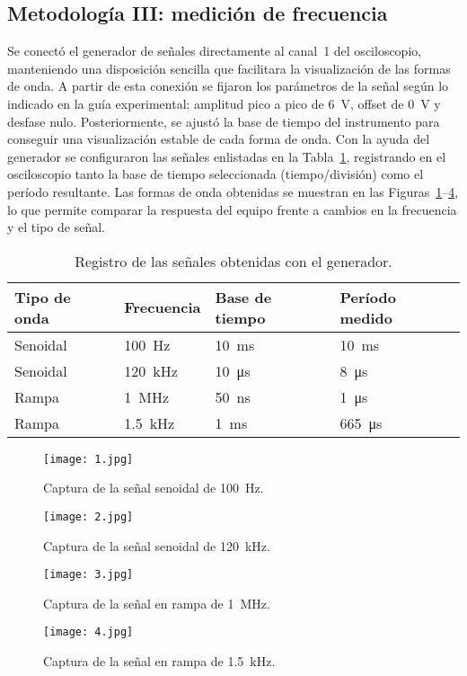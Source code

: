 \documentclass[conference]{IEEEtran} %
\begin{document}
\subsection{Metodología III: medición de frecuencia}
Se conectó el generador de señales directamente al canal~1 del osciloscopio, manteniendo una disposición sencilla que facilitara la visualización de las formas de onda. A partir de esta conexión se fijaron los parámetros de la señal según lo indicado en la guía experimental: amplitud pico a pico de \SI{6}{\volt}, offset de \SI{0}{\volt} y desfase nulo. Posteriormente, se ajustó la base de tiempo del instrumento para conseguir una visualización estable de cada forma de onda.
Con la ayuda del generador se configuraron las señales enlistadas en la Tabla~\ref{tab:frecuencia}, registrando en el osciloscopio tanto la base de tiempo seleccionada (tiempo/división) como el período resultante. Las formas de onda obtenidas se muestran en las Figuras~\ref{fig:frecuencia-senoidal-100hz}--\ref{fig:frecuencia-rampa-1k5hz}, lo que permite comparar la respuesta del equipo frente a cambios en la frecuencia y el tipo de señal.%
\begin{table}[htbp]
    \centering
    \caption{Registro de las señales obtenidas con el generador.}
    \label{tab:frecuencia}
    \begin{tabular}{@{}llll@{}}
        \toprule
        Tipo de onda & Frecuencia & Base de tiempo & Período medido \\ \midrule
        Senoidal & \SI{100}{\hertz} & \SI{10}{\milli\second} & \SI{10}{\milli\second} \\
        Senoidal & \SI{120}{\kilo\hertz} & \SI{10}{\micro\second} & \SI{8}{\micro\second} \\
        Rampa & \SI{1}{\mega\hertz} & \SI{50}{\nano\second} & \SI{1}{\micro\second} \\
        Rampa & \SI{1.5}{\kilo\hertz} & \SI{1}{\milli\second} & \SI{665}{\micro\second} \\
        \bottomrule
    \end{tabular}
\end{table}
\begin{figure}[htbp]
    \centering
    \texttt{[image: 1.jpg]}
    \caption{Captura de la señal senoidal de \SI{100}{\hertz}.}
    \label{fig:frecuencia-senoidal-100hz}
\end{figure}
\begin{figure}[htbp]
    \centering
    \texttt{[image: 2.jpg]}
    \caption{Captura de la señal senoidal de \SI{120}{\kilo\hertz}.}
    \label{fig:frecuencia-senoidal-120khz}
\end{figure}
\begin{figure}[htbp]
    \centering
    \texttt{[image: 3.jpg]}
    \caption{Captura de la señal en rampa de \SI{1}{\mega\hertz}.}
    \label{fig:frecuencia-rampa-1mhz}
\end{figure}
\begin{figure}[htbp]
    \centering
    \texttt{[image: 4.jpg]}
    \caption{Captura de la señal en rampa de \SI{1.5}{\kilo\hertz}.}
    \label{fig:frecuencia-rampa-1k5hz}
\end{figure}
\end{document}
